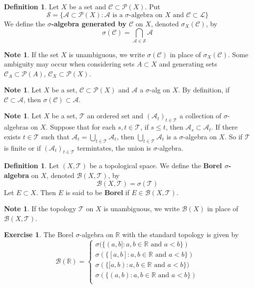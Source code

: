 \documentclass{book}
\theoremstyle{definition}
\newtheorem{defn}[definition]{Definition}
\newtheorem{note}[definition]{Note}
\newtheorem{ex}[definition]{Exercise}
\newcommand{\sig}{\sigma}
\newcommand{\R}{\mathbb{R}}
\newcommand{\MA}{\mathcal{A}}
\newcommand{\MB}{\mathcal{B}}
\newcommand{\MC}{\mathcal{C}}
\newcommand{\ML}{\mathcal{L}}
\newcommand{\MP}{\mathcal{P}}
\newcommand{\MS}{\mathcal{S}}
\newcommand{\MT}{\mathcal{T}}
\newcommand{\lex}[1]{\label{ex:#1}}
\newcommand{\ld}[1]{\label{defn:#1}}
\DeclareMathOperator*{\0}{\mbf{0}}
\DeclareMathOperator*{\1}{\mbf{1}}
\begin{document}
	\begin{defn} \ld{00000} 
		Let $X$ be a set and $\MC \subset \MP(X)$. Put $$\MS = \{\MA \subset \MP(X): \MA \text{ is a }\sig\text{-algebra on }X \text{ and } \MC \subset \ML\}$$ We define the \textbf{$\sig$-algebra generated by $\MC$} on $X$, denoted $\sig_X(\MC)$, by $$\sig(\MC) = \bigcap_{\MA \in \MS} \MA $$
	\end{defn}

	\begin{note}
		If the set $X$ is unambiguous, we write $\sig(\MC)$ in place of $\sig_X(\MC)$. Some ambiguity may occur when considering sets $A \subset X$ and generating sets $\MC_A \subset \MP(A)$, $\MC_X \subset \MP(X)$. 
	\end{note}
	
	\begin{note}
		Let $X$ be a set, $\MC \subset \MP(X)$ and $\MA$ a $\sig$-alg on $X$. By definition, if $\MC \subset \MA$, then $\sig(\MC) \subset \MA$.
	\end{note}
	
	\begin{note}
		Let $X$ be a set, $\MT$ an ordered set and $(\MA_t)_{t\in \MT}$ a collection of $\sig$-algebras on $X$. Suppose that for each $s,t \in \MT$, if $s \leq t$, then $\MA_s \subset \MA_t$. If there exists $t \in \MT$ such that $\MA_t = \bigcup\limits_{t \in \MT}\MA_t$, then $\bigcup\limits_{t \in \MT}\MA_t$ is a $\sig$-algebra on $X$. So if $\MT$ is finite or if $(\MA_t)_{t \in \MT}$ termintates, the union is $\sig$-algebra.
	\end{note}
	
	\begin{defn} \ld{00000} 
		Let $(X,\MT)$ be a topological space. We define the \textbf{Borel $\sig$-algebra} on $X$, denoted $\MB(X, \MT)$, by 
		$$\MB(X, \MT) = \sig(\MT)$$  
		Let $E \subset X$. Then $E$ is said to be \textbf{Borel} if $E \in \MB(X, \MT)$.
	\end{defn}

	\begin{note}
		If the topology $\MT$ on $X$ is unambiguous, we write $\MB(X)$ in place of $\MB(X, \MT)$.
	\end{note}
	
	\begin{ex} \lex{00000} 
		The Borel $\sigma$-algebra on $\R$ with the standard topology is given by 
		\[
		\MB(\R) =
		\begin{cases}
			\sig(\{(a,b]:a,b \in \R \text{ and } a<b\}) \\
			\sig(\{[a,b]:a,b \in \R \text{ and } a<b\}) \\
			\sig(\{[a,b):a,b \in \R \text{ and } a<b\}) \\
			\sig(\{(a,b):a,b \in \R \text{ and } a<b\}) \\
		\end{cases}
		\]
	\end{ex}
	
\end{document}
